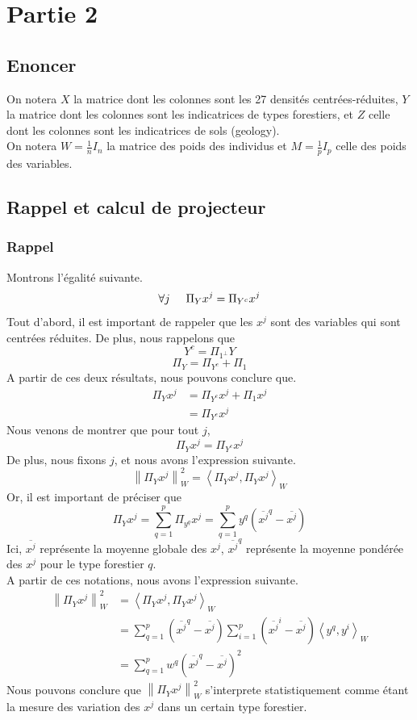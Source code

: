 \documentclass{article}
\begin{document}
\newpage
\section{Partie 2}
\subsection{Enoncer}
On notera $X$ la matrice dont les colonnes sont les 27 densités centrées-réduites, $Y$ la
matrice dont les colonnes sont les indicatrices de types forestiers, et $Z$ celle dont les
colonnes sont les indicatrices de sols (geology). \\
On notera $W=\frac{1}{n}I_n$ la matrice des poids des individus et $M=\frac{1}{p}I_p$
celle des poids des variables.
\subsection{Rappel et calcul de projecteur}
\subsubsection{Rappel}
Montrons l'égalité suivante. \\
\[
\forall j \hspace{0.5cm} \Pi_Y x^j = \Pi_{Y^c} x^j
\]
Tout d'abord, il est important de rappeler que les $x^j$ sont des variables qui sont
centrées réduites. De plus, nous rappelons que 
\[
Y^c = \Pi_{1^\perp} Y 
\]
\[
\Pi_Y = \Pi_{Y^c} + \Pi_1
\]
A partir de ces deux résultats, nous pouvons conclure que. \\
\begin{align*}
    \Pi_Y x^j & = \Pi_{Y^c} x^j + \Pi_1 x^j \\
    &= \Pi_{Y^c} x^j
\end{align*}
Nous venons de montrer que pour tout $j$, 
\[
\Pi_Y x^j = \Pi_{Y^c} x^j
\]
De plus, nous fixons $j$, et nous avons l'expression suivante.
\[
\left\lVert \Pi_Y x^j \right\rVert^2 _W = \left\langle \Pi_Y x^j,\Pi_Y x^j\right\rangle_W
\]
Or, il est important de préciser que
\[
\Pi_Y x^j=\sum_{q = 1}^{p}\Pi_{y^q} x^j=\sum_{q = 1}^{p}y^q( \overline{x^j}^q - {\overline{x^j}} )  
\]
Ici, $\overline{x^j}$ représente la moyenne globale des $x^j$, $\overline{x^j}^q$ représente la moyenne pondérée des $x^j$ pour le type forestier $q$.\\
A partir de ces notations, nous avons l'expression suivante.
\begin{align*}
    \left\lVert \Pi_Y x^j \right\rVert^2 _W &= \left\langle \Pi_Y x^j,\Pi_Y x^j\right\rangle_W \\
     &=  \sum_{q = 1}^{p}( \overline{x^j}^q - {\overline{x^j}} ) \sum_{ i= 1}^{p}( \overline{x^j}^i - {\overline{x^j}} )\left\langle y^q,y^i\right\rangle_W \\
     &= \sum_{q = 1}^{p}w^q( \overline{x^j}^q - {\overline{x^j}} )^2
\end{align*}
Nous pouvons conclure que $\left\lVert \Pi_Y x^j \right\rVert^2 _W$ s'interprete statistiquement comme
étant la mesure des variation des $x^j$ dans un certain type forestier.
\\
\\
\end{document}
